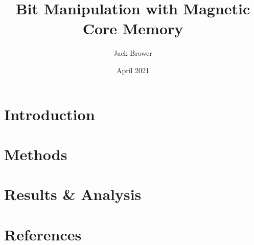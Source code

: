 \documentclass{article}
\title{Bit Manipulation with Magnetic Core Memory}
\author{Jack Brower}
\date{April 2021}
\begin{document}
\maketitle

\section{Introduction}


\newpage\section{Methods}

\newpage\section{Results \& Analysis}

\newpage\section{References}
\end{document}
